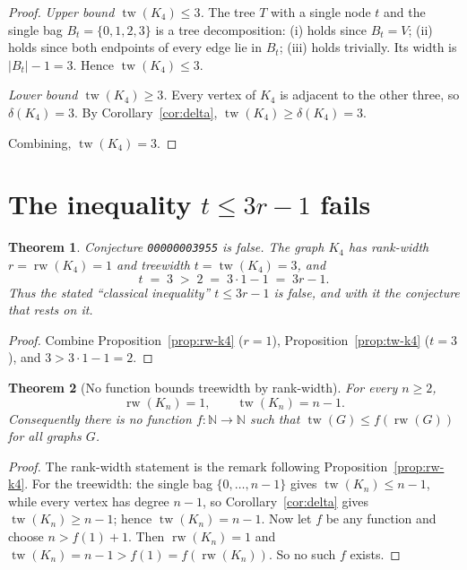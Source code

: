 \documentclass[11pt]{article}
\newtheorem{theorem}{Theorem}
\theoremstyle{definition}
\theoremstyle{remark}
\newcommand{\rw}{\operatorname{rw}}
\newcommand{\tw}{\operatorname{tw}}
\begin{document}
\begin{proof}
\emph{Upper bound $\tw(K_4) \le 3$.} The tree $T$ with a single node $t$ and
the single bag $B_t = \{0,1,2,3\}$ is a tree decomposition: (i) holds since
$B_t = V$; (ii) holds since both endpoints of every edge lie in $B_t$; (iii)
holds trivially. Its width is $|B_t| - 1 = 3$. Hence $\tw(K_4) \le 3$.

\emph{Lower bound $\tw(K_4) \ge 3$.} Every vertex of $K_4$ is adjacent to the
other three, so $\delta(K_4) = 3$. By Corollary~\ref{cor:delta}, $\tw(K_4) \ge
\delta(K_4) = 3$.

Combining, $\tw(K_4) = 3$.
\end{proof}

\section{The inequality $t \le 3r-1$ fails}

\begin{theorem}\label{thm:main}
Conjecture \texttt{00000003955} is false. The graph $K_4$ has rank-width
$r = \rw(K_4) = 1$ and treewidth $t = \tw(K_4) = 3$, and
\[
t \;=\; 3 \;>\; 2 \;=\; 3 \cdot 1 - 1 \;=\; 3r - 1 .
\]
Thus the stated ``classical inequality'' $t \le 3r-1$ is false, and with it
the conjecture that rests on it.
\end{theorem}

\begin{proof}
Combine Proposition~\ref{prop:rw-k4} ($r=1$), Proposition~\ref{prop:tw-k4}
($t=3$), and $3 > 3\cdot 1 - 1 = 2$.
\end{proof}

\begin{theorem}[No function bounds treewidth by rank-width]\label{thm:no-function}
For every $n \ge 2$,
\[
\rw(K_n) = 1, \qquad \tw(K_n) = n - 1 .
\]
Consequently there is no function $f \colon \mathbb{N} \to \mathbb{N}$ such that
$\tw(G) \le f(\rw(G))$ for all graphs $G$.
\end{theorem}

\begin{proof}
The rank-width statement is the remark following
Proposition~\ref{prop:rw-k4}. For the treewidth: the single bag $\{0,\dots,n-1\}$
gives $\tw(K_n) \le n-1$, while every vertex has degree $n-1$, so
Corollary~\ref{cor:delta} gives $\tw(K_n) \ge n-1$; hence $\tw(K_n) = n-1$.
Now let $f$ be any function and choose $n > f(1) + 1$. Then $\rw(K_n) = 1$ and
$\tw(K_n) = n - 1 > f(1) = f(\rw(K_n))$. So no such $f$ exists.
\end{proof}
\end{document}
